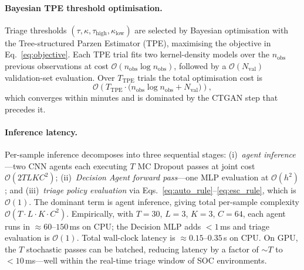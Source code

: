 \documentclass[3p]{elsarticle}
\begin{document}
\paragraph{Bayesian TPE threshold optimisation.}
Triage thresholds $(\tau, \kappa, \tau_{\mathrm{high}}, \kappa_{\mathrm{low}})$ are
selected by Bayesian optimisation with the Tree-structured Parzen Estimator (TPE),
maximising the objective in Eq.~\eqref{eq:objective}.
Each TPE trial fits two kernel-density models over the $n_{\mathrm{obs}}$ previous
observations at cost $\mathcal{O}(n_{\mathrm{obs}} \log n_{\mathrm{obs}})$, followed
by a $\mathcal{O}(N_{\mathrm{val}})$ validation-set evaluation.
Over $T_{\mathrm{TPE}}$ trials the total optimisation cost is
\begin{equation}
  \mathcal{O}\!\left(T_{\mathrm{TPE}} \cdot
  \bigl(n_{\mathrm{obs}} \log n_{\mathrm{obs}} + N_{\mathrm{val}}\bigr)\right),
  \label{eq:tpe_complexity}
\end{equation}
which converges within minutes and is dominated by the CTGAN step that precedes it.

\paragraph{Inference latency.}
Per-sample inference decomposes into three sequential stages:
(i)~\emph{agent inference}---two CNN agents each executing $T$ MC Dropout passes at joint
cost $\mathcal{O}(2 T L K C^2)$;
(ii)~\emph{Decision Agent forward pass}---one MLP evaluation at $\mathcal{O}(h^2)$; and
(iii)~\emph{triage policy evaluation} via Eqs.~\eqref{eq:auto_rule}--\eqref{eq:esc_rule},
which is $\mathcal{O}(1)$.
The dominant term is agent inference, giving total per-sample complexity
$\mathcal{O}(T \cdot L \cdot K \cdot C^2)$.
Empirically, with $T=30$, $L=3$, $K=3$, $C=64$, each agent runs in $\approx 60$--$150$\,ms on
CPU; the Decision MLP adds $<1$\,ms and triage evaluation is $\mathcal{O}(1)$.
Total wall-clock latency is $\approx 0.15$--$0.35$\,s on CPU.
On GPU, the $T$ stochastic passes can be batched, reducing latency by a factor of $\sim T$
to $<10$\,ms---well within the real-time triage window of SOC environments.
\end{document}
